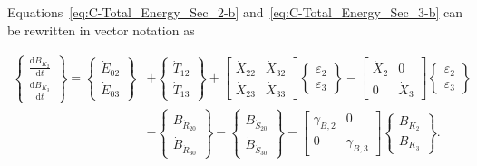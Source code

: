 Equations~\ref{eq:C-Total_Energy_Sec_2-b} 
and~\ref{eq:C-Total_Energy_Sec_3-b} can be rewritten 
in vector notation as

\begin{equation} \label{eq:C-Expanded_Matrix_Form}
	\begin{split}
		\begin{Bmatrix}
			\frac{\mathrm{d}B_{K_{2}}}{\mathrm{d}t} \\[0.4em] %
			\frac{\mathrm{d}B_{K_{3}}}{\mathrm{d}t} 
		\end{Bmatrix}
		=
		\begin{Bmatrix}
			\dot{E}_{02}\\
			\dot{E}_{03}
		\end{Bmatrix}
		& +                                               %
		\begin{Bmatrix}
			\dot{T}_{12}\\
			\dot{T}_{13}
		\end{Bmatrix}
		+
		\begin{bmatrix}
			\dot{X}_{22} & \dot{X}_{32}\\
			\dot{X}_{23} & \dot{X}_{33}
		\end{bmatrix}
		\begin{Bmatrix}
			\varepsilon_{2}\\
			\varepsilon_{3}
		\end{Bmatrix}   
		- 
		\begin{bmatrix}
			\dot{X}_{2} & 0          \\
			0           & \dot{X}_{3}
		\end{bmatrix}
		\begin{Bmatrix}
			\varepsilon_{2}\\
			\varepsilon_{3}
		\end{Bmatrix} \\                                 %
		& -                                              %
		\begin{Bmatrix}
			\dot{B}_{\dot{R}_{20}}  \\
			\dot{B}_{\dot{R}_{30}} 
		\end{Bmatrix}
		-
		\begin{Bmatrix}
			\dot{B}_{\dot{S}_{20}}  \\
			\dot{B}_{\dot{S}_{30}} 
		\end{Bmatrix}
		-
		\begin{bmatrix}
			\gamma_{B,2} & 0          \\
			0            & \gamma_{B,3}
		\end{bmatrix}
		\begin{Bmatrix}
			B_{K_{2}}\\
			B_{K_{3}}
		\end{Bmatrix}.
	\end{split}
\end{equation}

